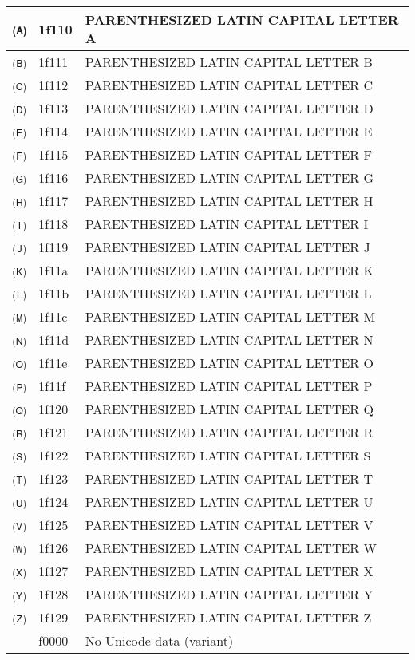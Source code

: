 \documentclass[12pt,letterpaper,openany]{book}
\begin{document}
\begin{center}
\begin{supertabular}{|m{0.25in}|m{0.5in}|m{4in}|}
🄐 & 1f110 & PARENTHESIZED LATIN CAPITAL LETTER A\\\hline
🄑 & 1f111 & PARENTHESIZED LATIN CAPITAL LETTER B\\\hline
🄒 & 1f112 & PARENTHESIZED LATIN CAPITAL LETTER C\\\hline
🄓 & 1f113 & PARENTHESIZED LATIN CAPITAL LETTER D\\\hline
🄔 & 1f114 & PARENTHESIZED LATIN CAPITAL LETTER E\\\hline
🄕 & 1f115 & PARENTHESIZED LATIN CAPITAL LETTER F\\\hline
🄖 & 1f116 & PARENTHESIZED LATIN CAPITAL LETTER G\\\hline
🄗 & 1f117 & PARENTHESIZED LATIN CAPITAL LETTER H\\\hline
🄘 & 1f118 & PARENTHESIZED LATIN CAPITAL LETTER I\\\hline
🄙 & 1f119 & PARENTHESIZED LATIN CAPITAL LETTER J\\\hline
🄚 & 1f11a & PARENTHESIZED LATIN CAPITAL LETTER K\\\hline
🄛 & 1f11b & PARENTHESIZED LATIN CAPITAL LETTER L\\\hline
🄜 & 1f11c & PARENTHESIZED LATIN CAPITAL LETTER M\\\hline
🄝 & 1f11d & PARENTHESIZED LATIN CAPITAL LETTER N\\\hline
🄞 & 1f11e & PARENTHESIZED LATIN CAPITAL LETTER O\\\hline
🄟 & 1f11f & PARENTHESIZED LATIN CAPITAL LETTER P\\\hline
🄠 & 1f120 & PARENTHESIZED LATIN CAPITAL LETTER Q\\\hline
🄡 & 1f121 & PARENTHESIZED LATIN CAPITAL LETTER R\\\hline
🄢 & 1f122 & PARENTHESIZED LATIN CAPITAL LETTER S\\\hline
🄣 & 1f123 & PARENTHESIZED LATIN CAPITAL LETTER T\\\hline
🄤 & 1f124 & PARENTHESIZED LATIN CAPITAL LETTER U\\\hline
🄥 & 1f125 & PARENTHESIZED LATIN CAPITAL LETTER V\\\hline
🄦 & 1f126 & PARENTHESIZED LATIN CAPITAL LETTER W\\\hline
🄧 & 1f127 & PARENTHESIZED LATIN CAPITAL LETTER X\\\hline
🄨 & 1f128 & PARENTHESIZED LATIN CAPITAL LETTER Y\\\hline
🄩 & 1f129 & PARENTHESIZED LATIN CAPITAL LETTER Z\\\hline
󰀀 & f0000 & No Unicode data (variant)\\\hline

\end{supertabular}
\end{center}
\end{document}
